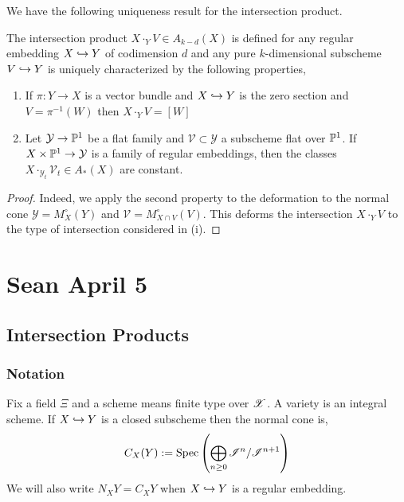 \documentclass[12pt]{article}
\begin{document}
\begin{rmk}
We have the following uniqueness result for the intersection product.
\end{rmk}

\begin{prop}
The intersection product $X \cdot_Y V \in A_{k-d}(X)$ is defined for any regular embedding $X \embed Y$ of codimension $d$ and any pure $k$-dimensional subscheme $V \embed Y$ is uniquely characterized by the following properties,
\begin{enumerate}
\item If $\pi : Y \to X$ is a vector bundle and $X \embed Y$ is the zero section and $V = \pi^{-1}(W)$ then $X \cdot_Y V = [W]$

\item Let $\mathcal{Y} \to \P^1$ be a flat family and $\mathcal{V} \subset \mathcal{Y}$ a subscheme flat over $\P^1$. If $X \times \P^1 \to \mathcal{Y}$ is a family of regular embeddings, then the classes $X \cdot_{\mathcal{Y}_t} \mathcal{V}_t \in A_*(X)$ are constant. 
\end{enumerate}
\end{prop}

\begin{proof}
Indeed, we apply the second property to the deformation to the normal cone $\mathcal{Y} = M_X^\circ(Y)$ and $\mathcal{V} = M^\circ_{X \cap V}(V)$. This deforms the intersection $X \cdot_Y V$ to the type of intersection considered in (i). 
\end{proof}

\section{Sean April 5}

\subsection{Intersection Products}

\subsubsection{Notation}

Fix a field $\Xi$ and a scheme means finite type over $\X$. A variety is an integral scheme. If $X \embed Y$ is a closed subscheme then the normal cone is,
\[ C_X(Y) := \Spec{\bigoplus_{n \ge 0} \I^n / \I^{n+1}} \]
We will also write $N_X Y = C_X Y$ when $X \embed Y$ is a regular embedding.
\end{document}
